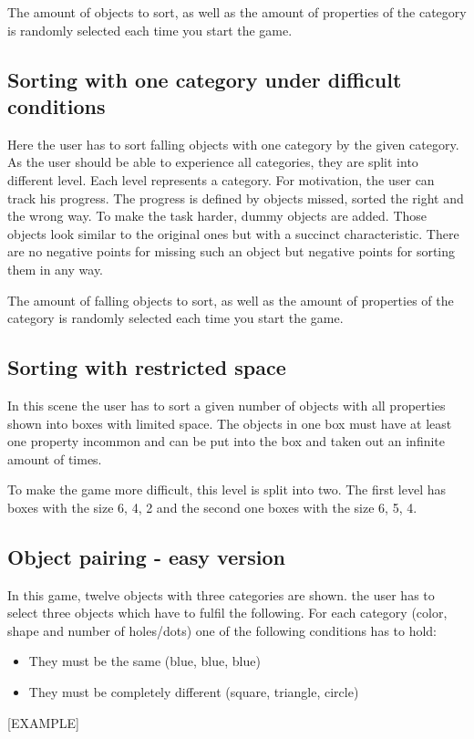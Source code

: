 The amount of objects to sort, as well as the amount of properties of the category
is randomly selected each time you start the game.

\subsection{Sorting with one category under difficult conditions}
Here the user has to sort falling objects with one category by the given category.
As the user should be able to experience all categories, they are split into different level.
Each level represents a category.
For motivation, the user can track his progress.
The progress is defined by objects missed, sorted the right and the wrong way.
To make the task harder, dummy objects are added.
Those objects look similar to the original ones but with a succinct characteristic.
There are no negative points for missing such an object but negative points for sorting them in any way.

The amount of falling objects to sort, as well as the amount of properties of the category
is randomly selected each time you start the game.

\subsection{Sorting with restricted space}
In this scene the user has to sort a given number of objects with all properties shown into boxes with limited space.
The objects in one box must have at least one property incommon and
can be put into the box and taken out an infinite amount of times.

To make the game more difficult, this level is split into two.
The first level has boxes with the size 6, 4, 2 and the second one boxes with the size 6, 5, 4.

\subsection{Object pairing - easy version}
In this game, twelve objects with three categories are shown.
the user has to select three objects which have to fulfil the following.
For each category (color, shape and number of holes/dots) one of the following conditions has to hold:
\begin{itemize}
    \item They must be the same (blue, blue, blue)
    \item They must be completely different (square, triangle, circle)
\end{itemize}
[EXAMPLE]

